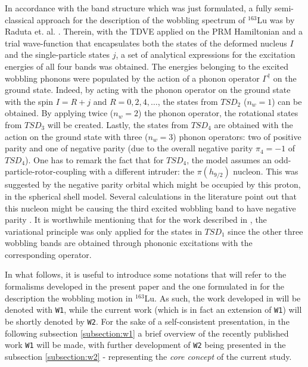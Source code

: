 \documentclass[11pt]{article}
\begin{document}
In accordance with the band structure which was just formulated, a fully semi-classical approach for the description of the wobbling spectrum of $^{163}$Lu was by Raduta et. al. \cite{raduta2017semiclassical}. Therein, with the TDVE applied on the PRM Hamiltonian and a trial wave-function that encapsulates both the states of the deformed nucleus $I$ and the single-particle states $j$, a set of analytical expressions for the excitation energies of all four bands was obtained. The energies belonging to the excited wobbling phonons were populated by the action of a phonon operator $\Gamma^\dagger$ on the ground state. Indeed, by acting with the phonon operator on the ground state with the spin $I=R+j$ and $R=0,2,4,\dots$, the states from $TSD_2$ ($n_w=1$) can be obtained. By applying twice ($n_w=2$) the phonon operator, the rotational states from $TSD_3$ will be created. Lastly, the states from $TSD_4$ are obtained with the action on the ground state with three ($n_w=3$) phonon operators: two of positive parity and one of negative parity (due to the overall negative parity $\pi_4=-1$ of $TSD_4$). One has to remark the fact that for $TSD_4$, the model assumes an odd-particle-rotor-coupling with a different intruder: the $\pi(h_{9/2})$ nucleon. This was suggested by the negative parity orbital which might be occupied by this proton, in the spherical shell model. Several calculations in the literature point out that this nucleon might be causing the third excited wobbling band to have negative parity \cite{jensen2004coexisting}. It is worthwhile mentioning that for the work described in \cite{raduta2017semiclassical}, the variational principle was only applied for the states in $TSD_1$ since the other three wobbling bands are obtained through phononic excitations with the corresponding operator.

In what follows, it is useful to introduce some notations that will refer to the formalisms developed in the present paper and the one formulated in \cite{raduta2020towards} for the description the wobbling motion in $^{163}$Lu. As such, the work developed in \cite{raduta2020towards} will be denoted with \texttt{W1}, while the current work (which is in fact an extension of \texttt{W1}) will be shortly denoted by \texttt{W2}. For the sake of a self-consistent presentation, in the following subsection \ref{subsection:w1} a brief overview of the recently published work \texttt{W1} will be made, with further development of \texttt{W2} being presented in the subsection \ref{subsection:w2} - representing the \emph{core concept} of the current study.
\end{document}
